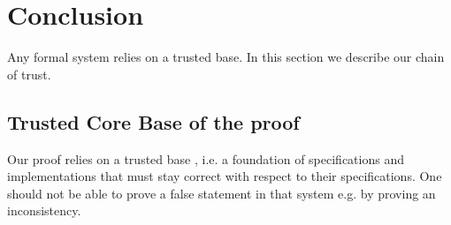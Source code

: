 \section{Conclusion}
\label{Conclusion}

Any formal system relies on a trusted base. In this section we describe our
chain of trust.

\subsection{Trusted Core Base of the proof}

Our proof relies on a trusted base , i.e. a foundation of specifications
and implementations that must stay correct with respect to their specifications.
One should not be able to prove a false statement in that system e.g. by proving
an inconsistency.

